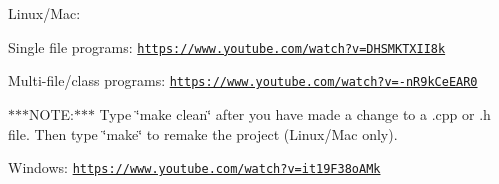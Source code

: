 Linux/\-Mac\-:


\begin{DoxyItemize}
\item Single file programs\-: \href{https://www.youtube.com/watch?v=DHSMKTXII8k}{\tt https\-://www.\-youtube.\-com/watch?v=\-D\-H\-S\-M\-K\-T\-X\-I\-I8k}
\item Multi-\/file/class programs\-: \href{https://www.youtube.com/watch?v=-nR9kCeEAR0}{\tt https\-://www.\-youtube.\-com/watch?v=-\/n\-R9k\-Ce\-E\-A\-R0}
\end{DoxyItemize}

$\ast$$\ast$$\ast$\-N\-O\-T\-E\-:$\ast$$\ast$$\ast$ Type \char`\"{}make clean\char`\"{} after you have made a change to a .cpp or .h file. Then type \char`\"{}make\char`\"{} to remake the project (Linux/\-Mac only).

Windows\-: \href{https://www.youtube.com/watch?v=it19F38oAMk}{\tt https\-://www.\-youtube.\-com/watch?v=it19\-F38o\-A\-Mk} 